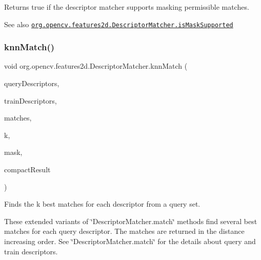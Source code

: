 Returns true if the descriptor matcher supports masking permissible matches.

\begin{DoxySeeAlso}{See also}
\href{http://docs.opencv.org/modules/features2d/doc/common_interfaces_of_descriptor_matchers.html#descriptormatcher-ismasksupported}{\tt org.\+opencv.\+features2d.\+Descriptor\+Matcher.\+is\+Mask\+Supported} 
\end{DoxySeeAlso}
\mbox{\label{classorg_1_1opencv_1_1features2d_1_1_descriptor_matcher_ac00ee4a90434accdd31bac8edbb3a39f}} 
\subsubsection{\texorpdfstring{knn\+Match()}{knnMatch()}\hspace{0.1cm}{\footnotesize\ttfamily [1/4]}}
{\footnotesize\ttfamily void org.\+opencv.\+features2d.\+Descriptor\+Matcher.\+knn\+Match (\begin{DoxyParamCaption}\item[{\mbox{\hyperlink{classorg_1_1opencv_1_1core_1_1_mat}{Mat}}}]{query\+Descriptors,  }\item[{\mbox{\hyperlink{classorg_1_1opencv_1_1core_1_1_mat}{Mat}}}]{train\+Descriptors,  }\item[{List$<$ \mbox{\hyperlink{classorg_1_1opencv_1_1core_1_1_mat_of_d_match}{Mat\+Of\+D\+Match}} $>$}]{matches,  }\item[{int}]{k,  }\item[{\mbox{\hyperlink{classorg_1_1opencv_1_1core_1_1_mat}{Mat}}}]{mask,  }\item[{boolean}]{compact\+Result }\end{DoxyParamCaption})}

Finds the k best matches for each descriptor from a query set.

These extended variants of \char`\"{}\+Descriptor\+Matcher.\+match\char`\"{} methods find several best matches for each query descriptor. The matches are returned in the distance increasing order. See \char`\"{}\+Descriptor\+Matcher.\+match\char`\"{} for the details about query and train descriptors.


